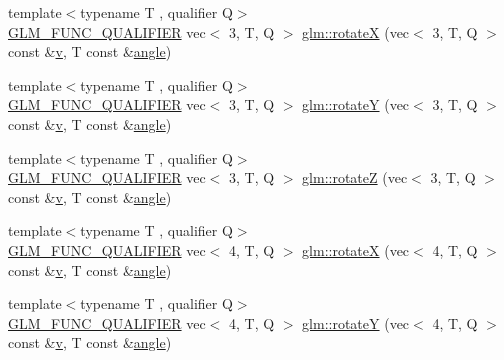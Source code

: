 \begin{DoxyCompactItemize}
{\footnotesize template$<$typename T , qualifier Q$>$ }\\\mbox{\hyperlink{setup_8hpp_a33fdea6f91c5f834105f7415e2a64407}{G\+L\+M\+\_\+\+F\+U\+N\+C\+\_\+\+Q\+U\+A\+L\+I\+F\+I\+ER}} vec$<$ 3, T, Q $>$ \mbox{\hyperlink{group__gtx__rotate__vector_ga059fdbdba4cca35cdff172a9d0d0afc9}{glm\+::rotateX}} (vec$<$ 3, T, Q $>$ const \&\mbox{\hyperlink{_s_d_l__opengl_8h_a10a82eabcb59d2fcd74acee063775f90}{v}}, T const \&\mbox{\hyperlink{_s_d_l__opengl__glext_8h_a9e06c1f76a20fed54ca742cd25cb02c4}{angle}})
\item 
{\footnotesize template$<$typename T , qualifier Q$>$ }\\\mbox{\hyperlink{setup_8hpp_a33fdea6f91c5f834105f7415e2a64407}{G\+L\+M\+\_\+\+F\+U\+N\+C\+\_\+\+Q\+U\+A\+L\+I\+F\+I\+ER}} vec$<$ 3, T, Q $>$ \mbox{\hyperlink{group__gtx__rotate__vector_gaebdc8b054ace27d9f62e054531c6f44d}{glm\+::rotateY}} (vec$<$ 3, T, Q $>$ const \&\mbox{\hyperlink{_s_d_l__opengl_8h_a10a82eabcb59d2fcd74acee063775f90}{v}}, T const \&\mbox{\hyperlink{_s_d_l__opengl__glext_8h_a9e06c1f76a20fed54ca742cd25cb02c4}{angle}})
\item 
{\footnotesize template$<$typename T , qualifier Q$>$ }\\\mbox{\hyperlink{setup_8hpp_a33fdea6f91c5f834105f7415e2a64407}{G\+L\+M\+\_\+\+F\+U\+N\+C\+\_\+\+Q\+U\+A\+L\+I\+F\+I\+ER}} vec$<$ 3, T, Q $>$ \mbox{\hyperlink{group__gtx__rotate__vector_ga5a048838a03f6249acbacb4dbacf79c4}{glm\+::rotateZ}} (vec$<$ 3, T, Q $>$ const \&\mbox{\hyperlink{_s_d_l__opengl_8h_a10a82eabcb59d2fcd74acee063775f90}{v}}, T const \&\mbox{\hyperlink{_s_d_l__opengl__glext_8h_a9e06c1f76a20fed54ca742cd25cb02c4}{angle}})
\item 
{\footnotesize template$<$typename T , qualifier Q$>$ }\\\mbox{\hyperlink{setup_8hpp_a33fdea6f91c5f834105f7415e2a64407}{G\+L\+M\+\_\+\+F\+U\+N\+C\+\_\+\+Q\+U\+A\+L\+I\+F\+I\+ER}} vec$<$ 4, T, Q $>$ \mbox{\hyperlink{group__gtx__rotate__vector_ga4333b1ea8ebf1bd52bc3801a7617398a}{glm\+::rotateX}} (vec$<$ 4, T, Q $>$ const \&\mbox{\hyperlink{_s_d_l__opengl_8h_a10a82eabcb59d2fcd74acee063775f90}{v}}, T const \&\mbox{\hyperlink{_s_d_l__opengl__glext_8h_a9e06c1f76a20fed54ca742cd25cb02c4}{angle}})
\item 
{\footnotesize template$<$typename T , qualifier Q$>$ }\\\mbox{\hyperlink{setup_8hpp_a33fdea6f91c5f834105f7415e2a64407}{G\+L\+M\+\_\+\+F\+U\+N\+C\+\_\+\+Q\+U\+A\+L\+I\+F\+I\+ER}} vec$<$ 4, T, Q $>$ \mbox{\hyperlink{group__gtx__rotate__vector_ga3ce3db0867b7f8efd878ee34f95a623b}{glm\+::rotateY}} (vec$<$ 4, T, Q $>$ const \&\mbox{\hyperlink{_s_d_l__opengl_8h_a10a82eabcb59d2fcd74acee063775f90}{v}}, T const \&\mbox{\hyperlink{_s_d_l__opengl__glext_8h_a9e06c1f76a20fed54ca742cd25cb02c4}{angle}})

\end{DoxyCompactItemize}
